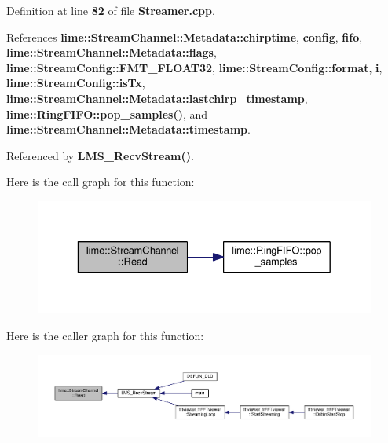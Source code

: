 Definition at line {\bf 82} of file {\bf Streamer.\+cpp}.



References {\bf lime\+::\+Stream\+Channel\+::\+Metadata\+::chirptime}, {\bf config}, {\bf fifo}, {\bf lime\+::\+Stream\+Channel\+::\+Metadata\+::flags}, {\bf lime\+::\+Stream\+Config\+::\+F\+M\+T\+\_\+\+F\+L\+O\+A\+T32}, {\bf lime\+::\+Stream\+Config\+::format}, {\bf i}, {\bf lime\+::\+Stream\+Config\+::is\+Tx}, {\bf lime\+::\+Stream\+Channel\+::\+Metadata\+::lastchirp\+\_\+timestamp}, {\bf lime\+::\+Ring\+F\+I\+F\+O\+::pop\+\_\+samples()}, and {\bf lime\+::\+Stream\+Channel\+::\+Metadata\+::timestamp}.



Referenced by {\bf L\+M\+S\+\_\+\+Recv\+Stream()}.



Here is the call graph for this function\+:
\nopagebreak
\begin{figure}[H]
\begin{center}
\leavevmode
\includegraphics[width=329pt]{d7/db1/classlime_1_1StreamChannel_a29be3725858bd7627b0f2aba5b0afa3e_cgraph}
\end{center}
\end{figure}




Here is the caller graph for this function\+:
\nopagebreak
\begin{figure}[H]
\begin{center}
\leavevmode
\includegraphics[width=350pt]{d7/db1/classlime_1_1StreamChannel_a29be3725858bd7627b0f2aba5b0afa3e_icgraph}
\end{center}
\end{figure}



